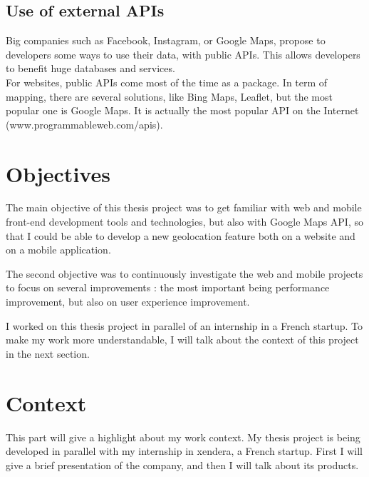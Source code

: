 \documentclass{article}
\begin{document}
                \subsection{Use of external APIs}
                    Big companies such as Facebook, Instagram, or Google Maps, propose to developers some ways to use their data, with public
                    APIs. This allows developers to benefit huge databases and services.\\
                    For websites, public APIs come most of the time as a package.
                    In term of mapping, there are several solutions, like Bing Maps, Leaflet, but the most popular one is Google Maps. It is actually the most
                    popular API on the Internet (www.programmableweb.com/apis).


        \newpage
        \section{Objectives}
            \vspace{1cm}
            The main objective of this thesis project was to get familiar with web and mobile front-end
            development tools and technologies, but also with Google Maps API, so that I could be able to develop a new geolocation feature both on a 
            website and on a mobile application. \newline


            The second objective was to continuously investigate the web and mobile projects to focus
            on several improvements : the most important being performance improvement, but also on user experience
            improvement.
            
            \vspace{1cm}

            I worked on this thesis project in parallel of an internship in a French startup. To make
            my work more understandable, I will talk about the context of this project in the next section.


        \newpage
        \section{Context}
            This part will give a highlight about my work context. My thesis project is being developed in
            parallel with my internship in xendera, a French startup. First I will give a brief presentation
            of the company, and then I will talk about its products.
\end{document}
